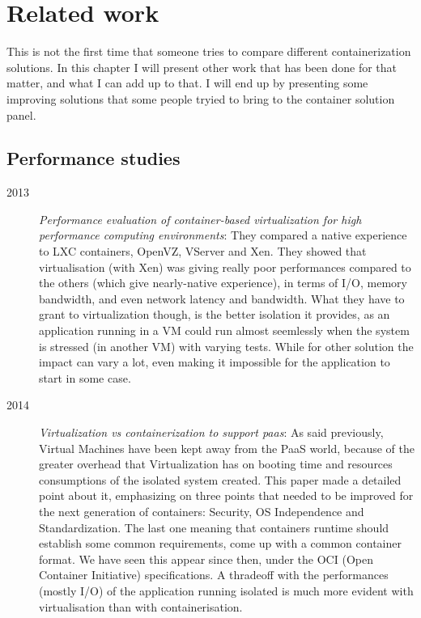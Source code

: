 \chapter{Related work}

This is not the first time that someone tries to compare different containerization solutions.  In this chapter I will present other work that has been done for that matter, and what I can add up to that.  I will end up by presenting some improving solutions that some people tryied to bring to the container solution panel.

\section{Performance studies}

\begin{description}
  \item[2013]\textit{Performance evaluation of container-based virtualization for high performance computing environments}\cite{xavier2013performance}: They compared a native experience to LXC containers, OpenVZ, VServer and Xen.  They showed that virtualisation (with Xen) was giving really poor performances compared to the others (which give nearly-native experience), in terms of I/O, memory bandwidth, and even network latency and bandwidth.  What they have to grant to virtualization though, is the better isolation it provides, as an application running in a VM could run almost seemlessly when the system is stressed (in another VM) with varying tests.  While for other solution the impact can vary a lot, even making it impossible for the application to start in some case.
  
  \item[2014] \textit{Virtualization vs containerization to support paas}\cite{dua2014virtualization}: As said previously, Virtual Machines have been kept away from the PaaS world, because of the greater overhead that Virtualization has on booting time and resources consumptions of the isolated system created.  This paper made a detailed point about it, emphasizing on three points that needed to be improved for the next generation of containers: Security, OS Independence and Standardization.  The last one meaning that containers runtime should establish some common requirements, come up with a common container format.  We have seen this appear since then, under the OCI (Open Container Initiative) specifications.  A thradeoff with the performances (mostly I/O) of the application running isolated is much more evident with virtualisation than with containerisation.
  

\end{description}
